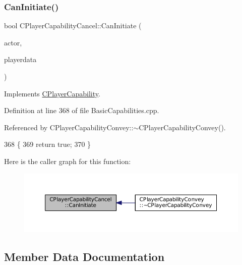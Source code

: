 \subsubsection{\texorpdfstring{Can\+Initiate()}{CanInitiate()}}
{\footnotesize\ttfamily bool C\+Player\+Capability\+Cancel\+::\+Can\+Initiate (\begin{DoxyParamCaption}\item[{std\+::shared\+\_\+ptr$<$ \hyperlink{classCPlayerAsset}{C\+Player\+Asset} $>$}]{actor,  }\item[{std\+::shared\+\_\+ptr$<$ \hyperlink{classCPlayerData}{C\+Player\+Data} $>$}]{playerdata }\end{DoxyParamCaption})\hspace{0.3cm}{\ttfamily [virtual]}}



Implements \hyperlink{classCPlayerCapability_aa83b1e1fcaff2985c378132d679154ea}{C\+Player\+Capability}.



Definition at line 368 of file Basic\+Capabilities.\+cpp.



Referenced by C\+Player\+Capability\+Convey\+::$\sim$\+C\+Player\+Capability\+Convey().


\begin{DoxyCode}
368                                                                                                            
                \{
369     \textcolor{keywordflow}{return} \textcolor{keyword}{true};
370 \}
\end{DoxyCode}
Here is the caller graph for this function\+:\nopagebreak
\begin{figure}[H]
\begin{center}
\leavevmode
\includegraphics[width=350pt]{classCPlayerCapabilityCancel_a8b4ad4a4983b01e458d439cf68fd2ba9_icgraph}
\end{center}
\end{figure}


\subsection{Member Data Documentation}
\hypertarget{classCPlayerCapabilityCancel_a239d2a965e7441fd81b79b8421707ff1}{}\label{classCPlayerCapabilityCancel_a239d2a965e7441fd81b79b8421707ff1} 
